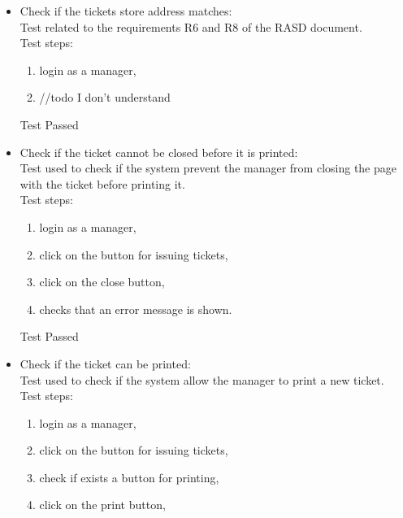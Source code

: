 \begin{itemize}
    \item Check if the tickets store address matches: \\
    Test related to the requirements R6 and R8 of the RASD document. \\
    Test steps: \\
    \begin{enumerate}

        \item login as a manager,

        \item //todo I don't understand
    \end{enumerate}
    Test Passed

    \item Check if the ticket cannot be closed before it is printed: \\
    Test used to check if the system prevent the manager from closing the page with the ticket before printing it. \\
    Test steps: \\
    \begin{enumerate}
        \item login as a manager,

        \item click on the button for issuing tickets,

        \item click on the close button,

        \item checks that an error message is shown.
    \end{enumerate}
    Test Passed \\

    \item Check if the ticket can be printed: \\
    Test used to check if the system allow the manager to print a new ticket. \\
    Test steps:\\
    \begin{enumerate}
        \item login as a manager,

        \item click on the button for issuing tickets,

        \item check if exists a button for printing,

        \item click on the print button,


\end{enumerate}
\end{itemize}
